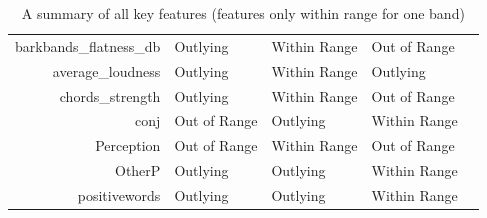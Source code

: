 \documentclass{article}\usepackage[]{graphicx}\usepackage[]{xcolor}
\begin{document}
\begin{table}[ht]
\begin{tabular}{rllll}
  barkbands\_flatness\_db & Outlying & Within Range & Out of Range \\ 
  average\_loudness & Outlying & Within Range & Outlying \\ 
  chords\_strength & Outlying & Within Range & Out of Range \\ 
  conj & Out of Range & Outlying & Within Range \\ 
  Perception & Out of Range & Within Range & Out of Range \\ 
  OtherP & Outlying & Outlying & Within Range \\ 
  positivewords & Outlying & Outlying & Within Range \\ 
   \hline
\end{tabular}
\caption{A summary of all key features (features only within range for one band)}
\label{feat.table}
\end{table}
\end{document}

